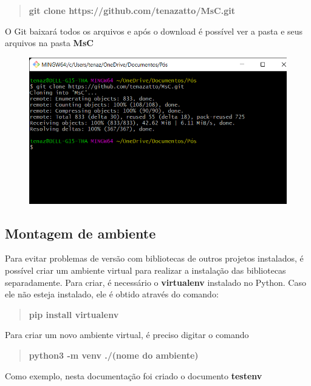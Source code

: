 \documentclass[portugues]{ic-tese}
\begin{document}
\begin{quote}\textbf{git clone https://github.com/tenazatto/MsC.git}\end{quote}

O Git baixará todos os arquivos e após o download é possível ver a pasta e seus arquivos na pasta \textbf{MsC}

\begin{figure}[h!]
\centering
\includegraphics[scale=0.4]{images/doc-install/git-clone.png}
\label{fig:DocInstallGitClone}
\end{figure}

\subsection{Montagem de ambiente}

Para evitar problemas de versão com bibliotecas de outros projetos instalados, é possível criar um ambiente virtual para realizar a instalação das bibliotecas separadamente. Para criar, é necessário o \textbf{virtualenv} instalado no Python. Caso ele não esteja instalado, ele é obtido através do comando:

\begin{quote}\textbf{pip install virtualenv}\end{quote}

Para criar um novo ambiente virtual, é preciso digitar o comando

\begin{quote}\textbf{python3 -m venv ./(nome do ambiente)}\end{quote}

Como exemplo, nesta documentação foi criado o documento \textbf{testenv}
\end{document}
